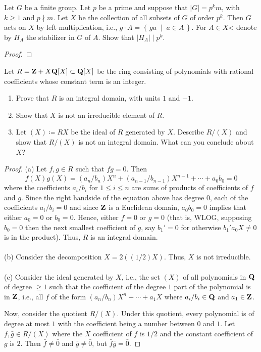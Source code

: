\begin{problem}
Let $G$ be a finite group. Let $p$ be a prime and suppose that $|G|=p^km$,
with $k\geq 1$ and $p\nmid m$. Let $X$ be the collection of all subsets of
$G$ of order $p^k$. Then $G$ acts on $X$ by left multiplication, i.e.,
$g\cdot A=\left\{\,ga\;\middle|\;a\in A\,\right\}$. For $A\in X$< denote by
$H_A$ the stabilizer in $G$ of $A$. Show that $|H_A|\mid p^k$.
\end{problem}
\begin{proof}
\end{proof}

\begin{problem}
Let $R=\mathbf{Z}+X\mathbf{Q}[X]\subset\mathbf{Q}[X]$ be the ring consisting of polynomials
with rational coefficients whose constant term is an integer.
\begin{enumerate}[label=(\alph*)]
\item Prove that $R$ is an integral domain, with units $1$ and $-1$.
\item Show that $X$ is not an irreducible element of $R$.
\item Let $(X)\coloneqq RX$ be the ideal of $R$ generated by $X$. Describe
  $R/(X)$ and show that $R/(X)$ is not an integral domain. What can you
  conclude about $X$?
\end{enumerate}
\end{problem}
\begin{proof}
(a) Let $f,g\in R$ such that $fg=0$. Then
\[
f(X)g(X)=(a_n/b_n)X^n+(a_{n-1}/b_{n-1})X^{n-1}+\cdots+a_0b_0=0
\]
where the coefficients $a_i/b_i$ for $1\leq i\leq n$ are sums of
products of coefficients of $f$ and $g$. Since the right handside of the
equation above has degree $0$, each of the coefficients $a_i/b_i=0$ and
since $\mathbf{Z}$ is a Euclidean domain, $a_0b_0=0$ implies that either $a_0=0$
or $b_0=0$. Hence, either $f=0$ or $g=0$ (that is, WLOG, supposing $b_0=0$
then the next smallest coefficient of $g$, say $b_1'=0$ for otherwise
$b_1'a_0X\neq 0$ is in the product). Thus, $R$ is an integral domain.
\\\\
(b) Consider the decomposition $X=2((1/2)X)$. Thus, $X$ is not
irreducible.
\\\\
(c) Consider the ideal generated by $X$, i.e., the set $(X)$ of all
polynomials in $\mathbf{Q}$ of degree $\geq 1$ such that the coefficient of the
degree $1$ part of the polynomial is in $\mathbf{Z}$, i.e., all $f$ of the form
$(a_n/b_n)X^n+\cdots+a_1X$ where $a_i/b_i\in\mathbf{Q}$ and $a_1\in\mathbf{Z}$.

Now, consider the quotient $R/(X)$. Under this quotient, every polynomial
is of degree at most $1$ with the coefficient being a number between $0$
and $1$. Let $\bar f,\bar g\in R/(X)$ where the $X$ coefficient of $f$ is
$1/2$ and the constant coefficient of $g$ is $2$. Then $\bar f\neq\bar 0$ and
$\bar g\neq\bar 0$, but $\bar f\bar g=\bar 0$.
\end{proof}

